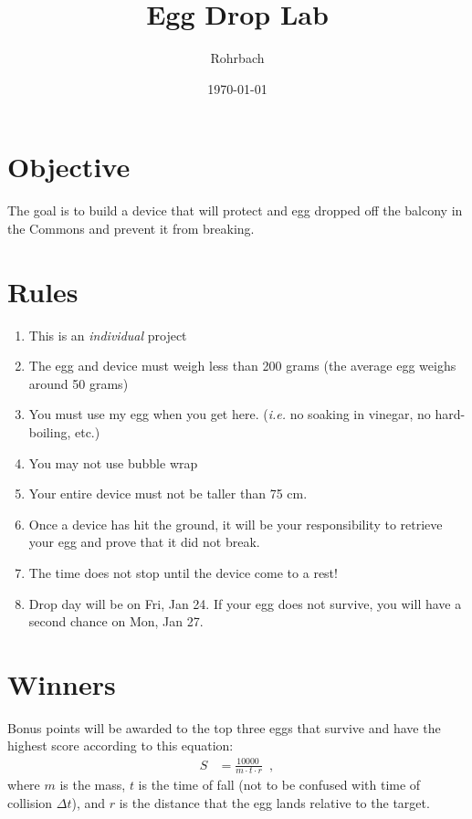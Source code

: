 \documentclass[10pt]{exam}
\title{Egg Drop Lab}
\author{Rohrbach}
\date{\today}
\begin{document}
\maketitle

\section*{Objective}

The goal is to build a device that will protect and egg dropped off the balcony in the Commons and prevent it from breaking.

\section*{Rules}

\begin{enumerate}
  \item This is an \emph{individual} project
  \item The egg and device must weigh less than 200 grams (the average egg weighs around 50 grams)
  \item You must use my egg when you get here. (\emph{i.e.} no soaking in vinegar, no hard-boiling, etc.)
  \item You may not use bubble wrap
  \item Your entire device must not be taller than 75 cm.
  \item Once a device has hit the ground, it will be your responsibility to retrieve your egg and prove that it did not break.
  \item The time does not stop until the device come to a rest!
  \item Drop day will be on Fri, Jan 24.  If your egg does not survive, you will have a second chance on Mon, Jan 27.
\end{enumerate}

\section*{Winners}

Bonus points will be awarded to the top three eggs that survive and have the highest score according to this equation:
%
\begin{align*}
  S &= \frac{\SI{10000}{}}{m\cdot t\cdot r} \,\,\,,
\end{align*}
%
where $m$ is the mass, $t$ is the time of fall (not to be confused with time of collision $\Delta t$), and $r$ is the distance that the egg lands relative to the target.
\end{document}
